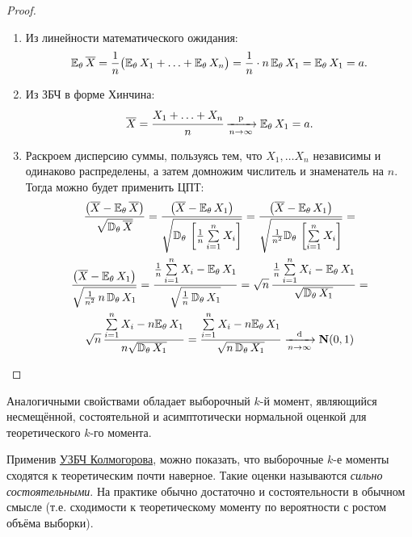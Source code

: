 \begin{proof}
\begin{enumerate}[label={\arabic*.}]
    \item Из линейности математического ожидания:
    $$\mathbb{E}_{\theta}\, \overline{X}=\frac{1}{n}\bigl(\mathbb{E}_{\theta}\,  X_{1}+\ldots + \mathbb{E}_{\theta}\, X_{n}\bigr)=\frac{1}{n} \cdot n \, \mathbb{E}_{\theta}\, X_{1}= \mathbb{E}_{\theta}\,  X_{1} = a.$$
    \item Из ЗБЧ в форме Хинчина:
    \begin{equation*}
        \overline{X} = 
        \cfrac{X_{1}+\ldots+X_{n}}{n} \xrightarrow[n \to \infty]{\text{p}} \mathbb{E}_{\theta}\, X_{1} = a.
    \end{equation*}

    \item Раскроем дисперсию суммы, пользуясь тем, что $X_1, \ldots X_n$ независимы и одинаково распределены, а затем домножим числитель и знаменатель на $n$. 
    Тогда можно будет применить ЦПТ:
    \begin{gather*}
        \frac{\bigl(\overline{X} - \mathbb{E}_{\theta}\, \overline{X} \bigr)}{\sqrt{\mathbb{D}_{\theta}\, \overline{X}}} =
        \frac{\bigl(\overline{X} - \mathbb{E}_{\theta}\, X_{1}\bigr)}{\sqrt{\mathbb{D}_{\theta}\, \left[ \frac{1}{n} \sum\limits_{i=1}^n X_i \right]}} = 
        \frac{\bigl(\overline{X} - \mathbb{E}_{\theta}\, X_{1}\bigr)}{\sqrt{\frac{1}{n^2} \mathbb{D}_{\theta}\, \left[ \sum\limits_{i=1}^n X_i \right]}} = \\
        \frac{\bigl(\overline{X} - \mathbb{E}_{\theta}\, X_{1}\bigr)}{\sqrt{\frac{1}{n^2} \, n \, \mathbb{D}_{\theta}\, X_1}} = 
        \frac{\frac{1}{n}\sum\limits_{i=1}^{n} X_{i} - \mathbb{E}_{\theta}\, X_{1}}{\sqrt{ \frac{1}{n} \, \mathbb{D}_{\theta}\, X_1}} = 
        \sqrt{n} \, \frac{\frac{1}{n}\sum\limits_{i=1}^{n} X_{i} - \mathbb{E}_{\theta}\, X_{1}}{\sqrt{\mathbb{D}_{\theta}\, X_1}} = \\
        \sqrt{n} \, \frac{\sum\limits_{i=1}^{n} X_{i} - n \mathbb{E}_{\theta}\, X_{1}}{n \sqrt{\mathbb{D}_{\theta}\, X_1}} =
        \frac{\sum\limits_{i=1}^{n} X_{i} - n \mathbb{E}_{\theta}\, X_{1}}{\sqrt{n \, \mathbb{D}_{\theta}\, X_1}} 
        \xrightarrow[n \to \infty]{\text{d}} \mathbf{N}(0, 1) 
    \end{gather*}
\end{enumerate}
\end{proof}

\begin{rmrk}
    Аналогичными свойствами обладает выборочный $k$-й момент, являющийся несмещённой, состоятельной и асимптотически нормальной оценкой для теоретического $k$-го момента.
\end{rmrk}

\begin{rmrk}
    Применив \hyperlink{SLLN}{УЗБЧ Колмогорова}, можно показать, что выборочные $k$-е моменты сходятся к теоретическим почти наверное. 
    Такие оценки называются \textit{сильно состоятельными}. На практике обычно достаточно и состоятельности в обычном смысле (т.е. сходимости к теоретическому моменту по вероятности с ростом объёма выборки).
\end{rmrk}

